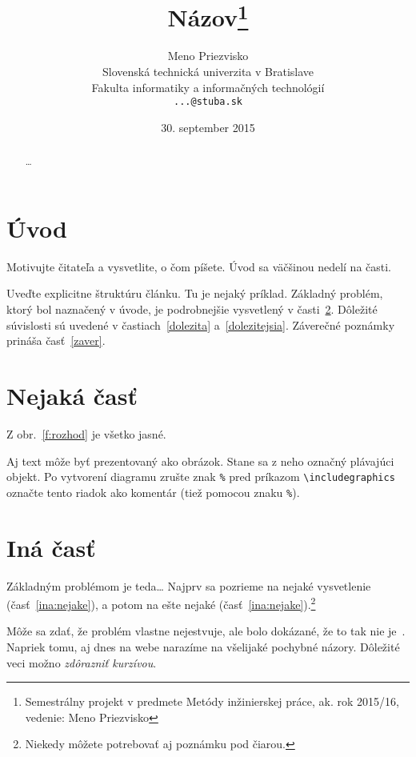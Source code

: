 \documentclass[10pt,twoside,slovak,a4paper]{coursepaper}
\title{Názov\thanks{Semestrálny projekt v predmete Metódy inžinierskej práce, ak. rok 2015/16, vedenie: Meno Priezvisko}} %
\author{Meno Priezvisko\\[2pt]
	{\small Slovenská technická univerzita v Bratislave}\\
	{\small Fakulta informatiky a informačných technológií}\\
	{\small \texttt{...@stuba.sk}}
	}
\date{\small 30. september 2015} %
\begin{document}
\maketitle

\begin{abstract}
\ldots
\end{abstract}



\section{Úvod}

Motivujte čitateľa a vysvetlite, o čom píšete. Úvod sa väčšinou nedelí na časti.

Uveďte explicitne štruktúru článku. Tu je nejaký príklad.
Základný problém, ktorý bol naznačený v úvode, je podrobnejšie vysvetlený v časti~\ref{nejaka}.
Dôležité súvislosti sú uvedené v častiach~\ref{dolezita} a~\ref{dolezitejsia}.
Záverečné poznámky prináša časť~\ref{zaver}.

\section{Nejaká časť} \label{nejaka}

Z obr.~\ref{f:rozhod} je všetko jasné. 

\begin{figure*}[tbh]
\centering
Aj text môže byť prezentovaný ako obrázok. Stane sa z neho označný plávajúci objekt. Po vytvorení diagramu zrušte znak \texttt{\%} pred príkazom \verb|\includegraphics| označte tento riadok ako komentár (tiež pomocou znaku \texttt{\%}).
\caption{Rozhodujúci argument.}
\label{f:rozhod}
\end{figure*}



\section{Iná časť} \label{ina}

Základným problémom je teda\ldots{} Najprv sa pozrieme na nejaké vysvetlenie (časť~\ref{ina:nejake}), a potom na ešte nejaké (časť~\ref{ina:nejake}).\footnote{Niekedy môžete potrebovať aj poznámku pod čiarou.}

Môže sa zdať, že problém vlastne nejestvuje\cite{Coplien:MPD}, ale bolo dokázané, že to tak nie je~\cite{Czarnecki:Staged, Czarnecki:Progress}. Napriek tomu, aj dnes na webe narazíme na všelijaké pochybné názory\cite{PLP-Framework}. Dôležité veci možno \emph{zdôrazniť kurzívou}.
\end{document}

